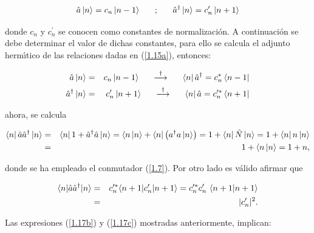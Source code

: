 \begin{equation}
\hat{a} \left\vert n\right\rangle =c_{n}\left\vert n-1\right\rangle ~\ \ \ \ ;~\ \
\ \ \hat{a}^{\dagger }\left\vert n\right\rangle =c_{n}^{\prime }\left\vert
n+1\right\rangle   \label{1.15a}
\end{equation}

donde $c_{n}$ y $c_{n}^{\prime }$ se conocen como constantes de normalizaci\'{o}n. A continuaci\'{o}n se debe determinar el valor de dichas constantes, para ello se calcula el adjunto herm\'{\i}tico de las relaciones dadas en
(\ref{1.15a}), entonces:

\begin{eqnarray}
\Oaa \left\vert n\right\rangle  &=&c_{n}\left\vert n-1 \right\rangle \text{ \ \ \ 
}\overset{\dagger }{\longrightarrow }\text{ \ \ \ }\left\langle n\right\vert
\Oaa^{\dagger }=c_{n}^{\ast }\left\langle n-1\right\vert  \label{1.17}
\\
\Oaa^{\dagger }\left\vert n\right\rangle  &=&c_{n}^{\prime }\left\vert
n+1\right\rangle \text{ \ \ \ }\overset{\dagger }{\longrightarrow }\text{ \
\ \ }\left\langle n\right\vert \Oaa = c_{n}^{\prime \ast }\left\langle n+1\right\vert   \label{1.17a}
\end{eqnarray}

ahora, se calcula 

\begin{eqnarray}
\left\langle n\right\vert \hat{a} \hat{a}^{\dagger }\left\vert n\right\rangle &=&\left\langle n\right\vert 1+\hat{a}^{\dagger } \hat{a} \left\vert n\right\rangle =\langle n\left\vert n\right\rangle +\left\langle n\right\vert \left(a^{\dagger }a\left\vert n\right\rangle \right) =1+\left\langle n\right\vert \hat{N} \left\vert n\right\rangle =1+\left\langle n\right\vert n\left\vert n\right\rangle   \notag \\
&=&1+\langle n\left\vert n\right\rangle =1+n  \label{1.17b},
\end{eqnarray}

donde se ha empleado el conmutador (\ref{1.7}). Por otro lado es v\'{a}lido afirmar que  

\begin{eqnarray}
\langle n| \Oaa \Oaa^{\dagger }|n\rangle  &=&c_{n}^{\prime \ast }\langle
n+1|c_{n}^{\prime }|n+1\rangle =c_{n}^{\prime \ast }c_{n}^{\prime }\text{\ }%
\langle n+1|n+1\rangle   \notag \\
&=&|c_{n}^{\prime }|^{2}  \label{1.17c}.
\end{eqnarray}

Las expresiones (\ref{1.17b}) y (\ref{1.17c}) mostradas anteriormente, implican:

